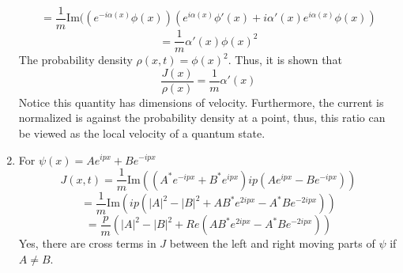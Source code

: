 \begin{sol}
\begin{enumerate}[label=\textbf{(\alph*)}]
   $$=\frac{1}{m}\text{Im}((e^{-i\alpha(x)}\phi(x))(e^{i\alpha(x)}\phi'(x)+i\alpha'(x)e^{i\alpha(x)}\phi(x))$$
$$=\frac{1}{m}\alpha'(x)\phi(x)^2$$ The probability density $\rho(x,t)=\phi(x)^2$. Thus, it is shown that
$$\frac{J(x)}{\rho(x)}=\frac{1}{m}\alpha'(x)$$ 
Notice this quantity has dimensions of velocity. Furthermore, the current is normalized is against the probability density at a point, thus, this ratio can be viewed as the local velocity of a quantum state.
\item
For $\psi(x)=Ae^{ipx}+Be^{-ipx}$
$$J(x,t)=\frac{1}{m}\text{Im}((A^*e^{-ipx}+B^*e^{ipx})ip(Ae^{ipx}-Be^{-ipx}))$$
$$=\frac{1}{m}\text{Im}(ip(|A|^2-|B|^2+AB^*e^{2ipx}-A^*Be^{-2ipx}))$$
$$=\frac{p}{m}(|A|^2-|B|^2+Re(AB^*e^{2ipx}-A^*Be^{-2ipx}))$$ 
Yes, there are cross terms in $J$ between the left and right moving parts of $\psi$ if $A\neq B$.

\end{enumerate}
\end{sol}